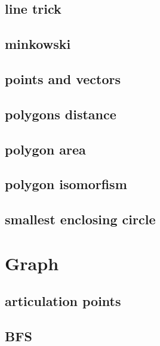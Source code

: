 \subsection{line trick}
\raggedbottom
\hrulefill
\subsection{minkowski}
\raggedbottom
\hrulefill
\subsection{points and vectors}
\raggedbottom
\hrulefill
\subsection{polygons distance}
\raggedbottom
\hrulefill
\subsection{polygon area}
\raggedbottom
\hrulefill
\subsection{polygon isomorfism}
\raggedbottom
\hrulefill
\subsection{smallest enclosing circle}
\raggedbottom
\hrulefill

\section{Graph}
\subsection{articulation points}
\raggedbottom
\hrulefill
\subsection{BFS}
\raggedbottom
\hrulefill
